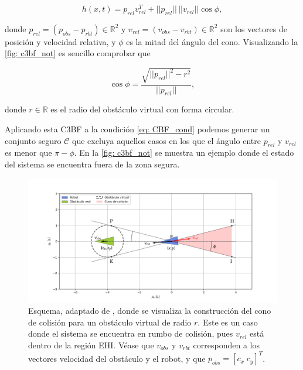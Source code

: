 \begin{equation} \label{eq: c3bf}
    h(x,t) = p_{rel} v_{rel}^T + ||p_{rel}|| \, ||v_{rel}|| \cos\phi,
\end{equation}

donde $p_{rel} = (p_{obs} - p_{rbt}) \in \mathds{R}^2$ y $v_{rel} = (v_{obs} - v_{rbt}) \in \mathds{R}^2$ son los vectores de posición y velocidad relativa, y $\phi$ es la mitad del ángulo del cono. Visualizando la \autoref{fig: c3bf_not} es sencillo comprobar que 

$$
\cos\phi = \frac{\sqrt{||p_{rel}||^2 - r^2}}{||p_{rel}||},
$$

donde $r \in \mathds{R}$ es el radio del obstáculo virtual con forma circular.

Aplicando esta C3BF a la condición \eqref{eq: CBF_cond} podemos generar un conjunto seguro $\mathcal{C}$ que excluya aquellos casos en los que el ángulo entre $p_{rel}$ y $v_{rel}$ es menor que $\pi - \phi$. En la \autoref{fig: c3bf_not} se muestra un ejemplo donde el estado del sistema se encuentra fuera de la zona segura.

\newpage

\begin{figure}[h!]
    \centering
    \includegraphics[trim={0 0cm 0 0cm}, clip, width=1\textwidth]{fig/C3BF_0.png}
    \caption{Esquema, adaptado de \cite{c3bf_car}, donde se visualiza la construcción del cono de colisión para un obstáculo virtual de radio $r$. Este es un caso donde el sistema se encuentra en rumbo de colisión, pues $v_{rel}$ está dentro de la región EHI. Véase que $v_{obs}$ y $v_{rbt}$ corresponden a los vectores velocidad del obstáculo y el robot, y que $p_{obs} = [c_x \; c_y]^T$.}
    \label{fig: c3bf_not}
\end{figure}


